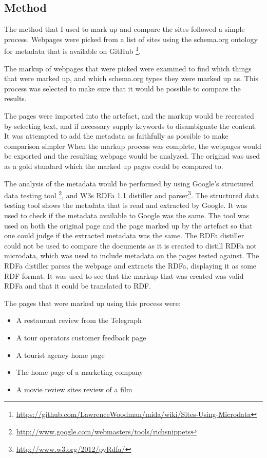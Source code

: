 \subsection{Method}
The method that I used to mark up and compare the sites followed a simple process.
Webpages were picked from a list of sites using the schema.org ontology for metadata that is available on GitHub
\footnote{\url{https://github.com/LawrenceWoodman/mida/wiki/Sites-Using-Microdata}}.

The markup of webpages that were picked were examined to find which things that were marked up,
and which schema.org types they were marked up as.
This process was selected to make sure that it would be possible to compare the results.

The pages were imported into the artefact, and the markup would be recreated by selecting text,
and if necessary supply keywords to disambiguate the content.
It was attempted to add the metadata as faithfully as possible to make comparison simpler
When the markup process was complete, the webpages would be exported and the resulting webpage would be analyzed.
The original was used as a gold standard which the marked up pages could be compared to.

The analysis of the metadata would be performed by using Google's structured data testing tool
\footnote{\url{http://www.google.com/webmasters/tools/richsnippets}},
and W3s RDFa 1.1 distiller and parser\footnote{\url{http://www.w3.org/2012/pyRdfa/}}.
The structured data testing tool shows the metadata that is read and extracted by Google.
It was used to check if the metadata available to Google was the same.
The tool was used on both the original page and the page marked up by the artefact so that one could judge if the
extracted metadata was the same.
The RDFa distiller could not be used to compare the documents as it is created to distill RDFa not microdata,
which was used to include metadata on the pages tested against.
The RDFa distiller parses the webpage and extracts the RDFa, displaying it as some RDF format.
It was used to see that the markup that was created was valid RDFa and that it could be translated to RDF.

The pages that were marked up using this process were:
\begin{itemize}
	\item A restaurant review from the Telegraph
	\item A tour operators customer feedback page
	\item A tourist agency home page
	\item The home page of a marketing company
	\item A movie review sites review of a film
\end{itemize}

